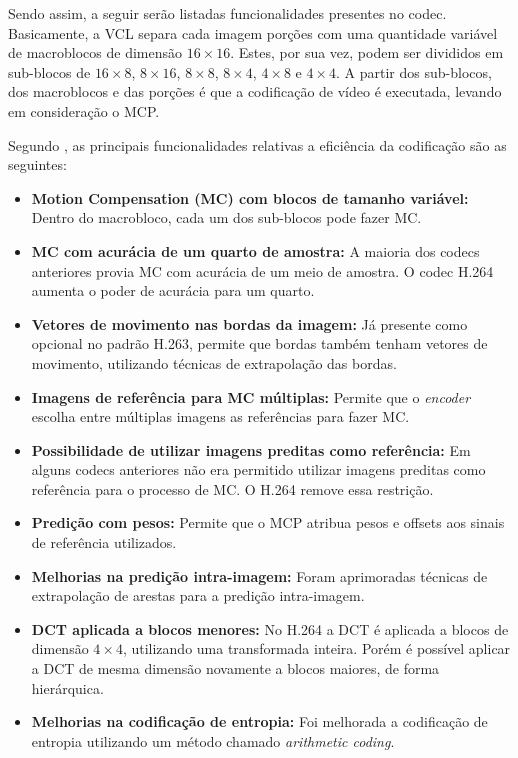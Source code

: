 \documentclass[cic,tc]{iiufrgs}
\begin{document}
Sendo assim, a seguir serão listadas funcionalidades presentes no codec.
Basicamente, a VCL separa cada imagem porções com uma quantidade variável de macroblocos 
de dimensão $16\times16$.
Estes, por sua vez, podem ser divididos em sub-blocos de $16\times8$, $8\times16$,
$8\times8$, $8\times4$, $4\times8$ e $4\times4$.
A partir dos sub-blocos, dos macroblocos e das porções é que a codificação de vídeo 
é executada, levando em consideração o MCP.

Segundo \citet{WiegangH264}, as principais funcionalidades relativas a eficiência
da codificação são as seguintes:
\begin{itemize}
    \item \textbf{Motion Compensation (MC) com blocos de tamanho variável:}
    Dentro do macrobloco, cada um dos sub-blocos pode fazer MC.
    \item \textbf{MC com acurácia de um quarto de amostra:} A maioria dos codecs anteriores 
    provia MC com acurácia de um meio de amostra. O codec H.264 aumenta o poder 
    de acurácia para um quarto.
    \item \textbf{Vetores de movimento nas bordas da imagem:} Já presente como opcional
    no padrão H.263, permite que bordas também tenham vetores de movimento, utilizando
    técnicas de extrapolação das bordas.
    \item \textbf{Imagens de referência para MC múltiplas:} Permite que o \textit{encoder}
    escolha entre múltiplas imagens as referências para fazer MC.
    \item \textbf{Possibilidade de utilizar imagens preditas como referência:} Em alguns 
    codecs anteriores não era permitido utilizar imagens preditas como referência para o 
    processo de MC. O H.264 remove essa restrição.
    \item \textbf{Predição com pesos:} Permite que o MCP atribua pesos e offsets aos 
    sinais de referência utilizados.
    \item \textbf{Melhorias na predição intra-imagem:} Foram aprimoradas técnicas de
    extrapolação de arestas para a predição intra-imagem.
    \item \textbf{DCT aplicada a blocos menores:} No H.264 a DCT é aplicada a blocos de 
    dimensão $4\times4$, utilizando uma transformada inteira. Porém é possível aplicar 
    a DCT de mesma dimensão novamente a blocos maiores, de forma hierárquica.
    \item \textbf{Melhorias na codificação de entropia:} Foi melhorada a codificação de 
    entropia utilizando um método chamado \emph{arithmetic coding}.
\end{itemize}
\end{document}
